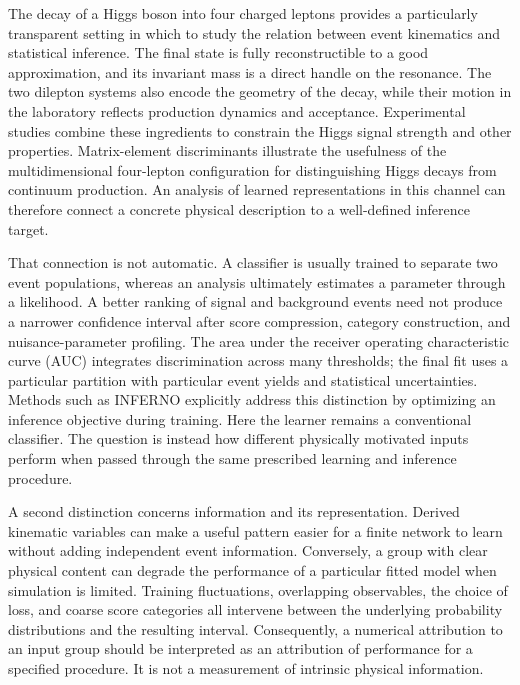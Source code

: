 \documentclass[aps,prd,reprint,superscriptaddress,nofootinbib,longbibliography,floatfix]{revtex4-2}
\begin{document}
The decay of a Higgs boson into four charged leptons provides a particularly
transparent setting in which to study the relation between event kinematics
and statistical inference. The final state is fully reconstructible to a good
approximation, and its invariant mass is a direct handle on the resonance.
The two dilepton systems also encode the geometry of the decay, while their
motion in the laboratory reflects production dynamics and acceptance.
Experimental studies combine these ingredients to constrain the Higgs signal
strength and other properties\cite{CMS2017}. Matrix-element discriminants
illustrate the usefulness of the multidimensional four-lepton configuration
for distinguishing Higgs decays from continuum production\cite{Avery2013}.
An analysis of learned representations in this channel can therefore connect
a concrete physical description to a well-defined inference target.

That connection is not automatic. A classifier is usually trained to separate
two event populations, whereas an analysis ultimately estimates a parameter
through a likelihood. A better ranking of signal and background events need
not produce a narrower confidence interval after score compression, category
construction, and nuisance-parameter profiling. The area under the receiver
operating characteristic curve (AUC) integrates discrimination across many
thresholds; the final fit uses a particular partition with particular event
yields and statistical uncertainties. Methods such as INFERNO explicitly
address this distinction by optimizing an inference objective during
training\cite{INFERNO2019}. Here the learner remains a conventional classifier.
The question is instead how different physically motivated inputs perform
when passed through the same prescribed learning and inference procedure.

A second distinction concerns information and its representation. Derived
kinematic variables can make a useful pattern easier for a finite network to
learn without adding independent event information. Conversely, a group with
clear physical content can degrade the performance of a particular fitted
model when simulation is limited. Training fluctuations, overlapping
observables, the choice of loss, and coarse score categories all intervene
between the underlying probability distributions and the resulting interval.
Consequently, a numerical attribution to an input group should be interpreted
as an attribution of performance for a specified procedure. It is not a
measurement of intrinsic physical information.
\end{document}
